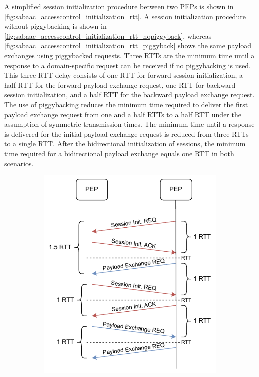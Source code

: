 \begin{description}
    A simplified session initialization procedure between two PEPs is shown in \autoref{fig:sabaac_accesscontrol_initialization_rtt}.
    A session initialization procedure without piggybacking is shown in \autoref{fig:sabaac_accesscontrol_initialization_rtt_nopiggyback}, whereas \autoref{fig:sabaac_accesscontrol_initialization_rtt_piggyback} shows the same payload exchanges using piggybacked requests.
    Three RTTs are the minimum time until a response to a domain-specific request can be received if no piggybacking is used.
    This three RTT delay consists of one RTT for forward session initialization, a half RTT for the forward payload exchange request, one RTT for backward session initialization, and a half RTT for the backward payload exchange request.
    The use of piggybacking reduces the minimum time required to deliver the first payload exchange request from one and a half RTTs to a half RTT under the assumption of symmetric transmission times.
    The minimum time until a response is delivered for the initial payload exchange request is reduced from three RTTs to a single RTT.
    After the bidirectional initialization of sessions, the minimum time required for a bidirectional payload exchange equals one RTT in both scenarios.
    \begin{figure}
        \centering
        \begin{subfigure}[t]{0.48\linewidth}
            \centering
            \includegraphics[width=\linewidth]{figures/SABAAC_protocols_accesscontrol_initialization_rtt_nopiggyback.drawio.pdf}

\end{subfigure}
\end{figure}
\end{description}
